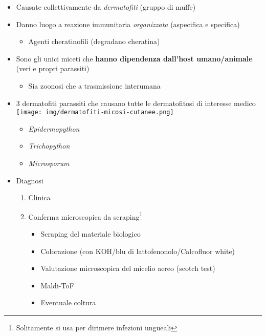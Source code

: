\documentclass[italian,]{article}
\providecommand{\tightlist}{%
  \setlength{\itemsep}{0pt}\setlength{\parskip}{0pt}}
\begin{document}
\begin{itemize}
\tightlist
\item
  Causate collettivamente da \emph{dermatofiti} (gruppo di muffe)
\item
  Danno luogo a reazione immunitaria \emph{organizzata} (aspecifica e
  specifica)

  \begin{itemize}
  \tightlist
  \item
    Agenti cheratinofili (degradano cheratina)
  \end{itemize}
\item
  Sono gli unici miceti che \textbf{hanno dipendenza dall'host
  umano/animale} (veri e propri parassiti)

  \begin{itemize}
  \tightlist
  \item
    Sia zoonosi che a trasmissione interumana
  \end{itemize}
\item
  3 dermatofiti parassiti che causano tutte le dermatofitosi di
  interesse medico\\
  \texttt{[image: img/dermatofiti-micosi-cutanee.png]}

  \begin{itemize}
  \tightlist
  \item
    \emph{Epidermopython}
  \item
    \emph{Trichopython}
  \item
    \emph{Microsporum}
  \end{itemize}
\item
  Diagnosi

  \begin{enumerate}
  \def\labelenumi{\arabic{enumi}.}
  \tightlist
  \item
    Clinica
  \item
    Conferma microscopica da scraping\footnote{Solitamente si usa per
      dirimere infezioni ungueali}

    \begin{itemize}
    \tightlist
    \item
      Scraping del materiale biologico
    \item
      Colorazione (con KOH/blu di lattofenonolo/Calcofluor white)
    \item
      Valutazione microscopica del micelio aereo (scotch test)
    \item
      Maldi-ToF
    \item
      Eventuale coltura
    \end{itemize}
  \end{enumerate}
\end{itemize}
\end{document}
